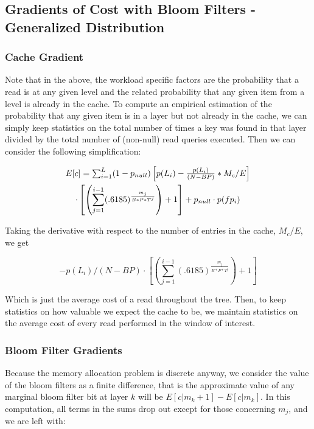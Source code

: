 \documentclass{sig-alternate-05-2015}
\begin{document}
\subsection{Gradients of Cost with Bloom Filters - Generalized Distribution}

\subsubsection{Cache Gradient}

Note that in the above, the workload specific factors are the probability that
a read is at any given level and the related probability that any given item
from a level is already in the cache. To compute an empirical estimation of the
probability that any given item is in a layer but not already in the cache, we
can simply keep statistics on the total number of times a key was found in that
layer divided by the total number of (non-null) read queries executed. Then we
can consider the following simplification:

\begin{multline}
$$E[c] = \sum_{i=1}^{L} (1-p_{null})\left[p(L_i) - \frac{p(L_i)}{(N - BP)} * M_c/E \right]\\ \cdot \left[ \left(\sum_{j=1}^{i-1} (.6185) ^  {\frac{m_j}{B*P*T^j}}\right) +1 \right] + p_{null} \cdot p(fp_i) $$
\end{multline}

Taking the derivative with respect to the number of entries in the cache,
$M_c/E$, we get 

$$
- p(L_i)/(N - BP) \cdot \left[ \left(\sum_{j=1}^{i-1} (.6185) ^  {\frac{m_j}{B*P*T^j}}\right) +1 \right]
$$

Which is just the average cost of a read throughout the tree. Then, to keep
statistics on how valuable we expect the cache to be, we maintain statistics on
the average cost of every read performed in the window of interest.

\subsubsection{Bloom Filter Gradients}

Because the memory allocation problem is discrete anyway, we consider the value
of the bloom filters as a finite difference, that is the approximate value of
any marginal bloom filter bit at layer $k$ will be $E[c | m_k+1] - E[c | m_k]$.
In this computation, all terms in the sums drop out except for those concerning
$m_j$, and we are left with:
\end{document}
